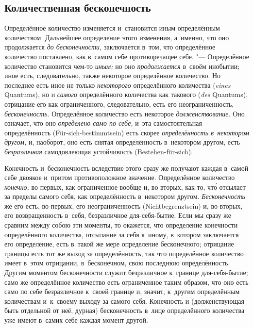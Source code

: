 \subsection{Количественная бесконечность}


Определённое количество изменяется и~становится иным определённым
количеством. Дальнейшее определение этого изменения, а~именно, что оно
продолжается {\em до бесконечности,} заключается в~том, что определённое
количество поставлено, как в~самом себе противоречащее себе. "--- Определённое
количество становится чем-то {\em иным;} но оно {\em продолжается} в~своём
инобытии; иное есть, следовательно, также некоторое определённое количество.
Но последнее есть иное не только {\em некоторого} определённого количества ({\em \!eines} Quantums),
но и {\em самого} определённого количества как такового ({\em \!des} Quantums), отрицание его как
ограниченного, следовательно, есть его неограниченность, {\em бесконечность}.
Определённое количество есть некоторое {\em долженствование}. Оно означает, что
оно {\em определено само по себе,} и~эта самостоятельная определённость
(Für-sich-bestimmt\-sein) есть скорее {\em определённость в~некотором другом,} и,
наоборот, оно есть снятая определённость в~некотором другом, есть
{\em безразличная} самодовлеющая устойчивость (Bestehen-für-sich).

Конечность и~бесконечность вследствие этого сразу же получают каждая в~самой
себе двоякое и~притом противоположное значение. Определённое количество
{\em конечно,} во-первых, как ограниченное вообще и, во-вторых, как то, чт\'{о}
отсылает за пределы самого себя, как определённость в~некотором другом.
{\em Бесконечность} же его есть, во-первых, его неограниченность (Nicht\-begrenzt\-sein) и, во-вторых,
его возвращенность в~себя, безразличное для-себя-бытие. Если мы сразу же
сравним между собою эти моменты, то окажется, что определение конечности
определённого количества, отсылание за себя к~иному, в~котором заключается его
определение, есть в~такой же мере определение бесконечного; отрицание границы
есть тот же выход за определённость, так что определённое количество имеет
в~этом отрицании, в~бесконечном, свою последнюю определённость. Другим моментом
бесконечности служит безразличное к~границе для-себя-бытие; само же
определённое количество есть ограниченное таким образом, что оно есть само по
себе безразличное к~своей границе и, значит, к~другим определённым количествам
и~к~своему выходу за самого себя. Конечность и (долженствующая быть отдельной
от неё, дурная) бесконечность в~лице определённого количества уже имеют в~самих
себе каждая момент другой.

